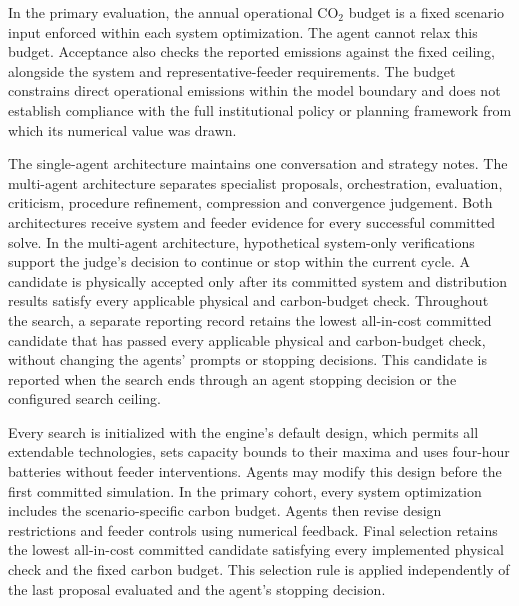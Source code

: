 \documentclass[pdflatex,sn-nature]{sn-jnl}
\begin{document}
In the primary evaluation, the annual operational CO$_2$ budget is a fixed scenario input enforced within each system optimization. The agent cannot relax this budget. Acceptance also checks the reported emissions against the fixed ceiling, alongside the system and representative-feeder requirements. The budget constrains direct operational emissions within the model boundary and does not establish compliance with the full institutional policy or planning framework from which its numerical value was drawn.

The single-agent architecture maintains one conversation and strategy notes. The multi-agent architecture separates specialist proposals, orchestration, evaluation, criticism, procedure refinement, compression and convergence judgement. Both architectures receive system and feeder evidence for every successful committed solve. In the multi-agent architecture, hypothetical system-only verifications support the judge's decision to continue or stop within the current cycle. A candidate is physically accepted only after its committed system and distribution results satisfy every applicable physical and carbon-budget check. Throughout the search, a separate reporting record retains the lowest all-in-cost committed candidate that has passed every applicable physical and carbon-budget check, without changing the agents' prompts or stopping decisions. This candidate is reported when the search ends through an agent stopping decision or the configured search ceiling.

Every search is initialized with the engine's default design, which permits all extendable technologies, sets capacity bounds to their maxima and uses four-hour batteries without feeder interventions. Agents may modify this design before the first committed simulation. In the primary cohort, every system optimization includes the scenario-specific carbon budget. Agents then revise design restrictions and feeder controls using numerical feedback. Final selection retains the lowest all-in-cost committed candidate satisfying every implemented physical check and the fixed carbon budget. This selection rule is applied independently of the last proposal evaluated and the agent's stopping decision.
\end{document}
